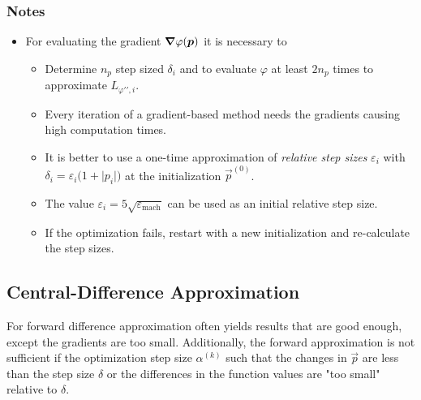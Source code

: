 			\subsubsection{Notes}
				\begin{itemize}
					\item For evaluating the gradient \( \grad{\varphi}(\bm{p}) \) it is necessary to
						\begin{itemize}
							\item Determine \(n_p\) step sized \(\delta_i\) and to evaluate \(\varphi\) at least \( 2n_p \) times to approximate \( L_{\varphi\prime\prime, i} \).
							\item Every iteration of a gradient-based method needs the gradients causing high computation times.
							\item It is better to use a one-time approximation of \emph{relative step sizes} \( \varepsilon_i \) with \( \delta_i = \varepsilon_i \big(1 + \lvert p_i \rvert\big) \) at the initialization \(\vec{p}^{(0)}\).
							\item The value \( \varepsilon_i = 5 \sqrt{\varepsilon_\mathrm{mach}} \) can be used as an initial relative step size.
							\item If the optimization fails, restart with a new initialization and re-calculate the step sizes.
						\end{itemize}
				\end{itemize}

		\subsection{Central-Difference Approximation}
			For forward difference approximation often yields results that are good enough, except the gradients are too small. Additionally, the forward approximation is not sufficient if the optimization step size \( \alpha^{(k)} \) such that the changes in \( \vec{p} \) are less than the step size \(\delta\) or the differences in the function values are "too small" relative to \(\delta\).

